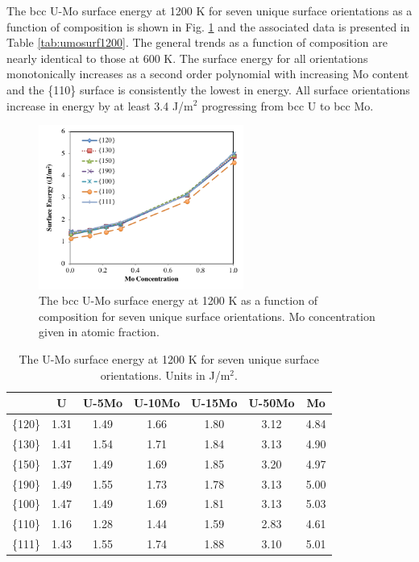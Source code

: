 \documentclass[review]{elsarticle}
\begin{document}
\FloatBarrier

The bcc U-Mo surface energy at 1200 K for seven unique surface orientations as a function of composition is shown in Fig. \ref{fig:umosurf1200} and the associated data is presented in Table \ref{tab:umosurf1200}. The general trends as a function of composition are nearly identical to those at 600 K. The surface energy for all orientations monotonically increases as a second order polynomial with increasing Mo content and the \{110\} surface is consistently the lowest in energy. All surface orientations increase in energy by at least 3.4 J/m$^{2}$ progressing from bcc U to bcc Mo. 

\begin{figure}[h]
 \centering
 \includegraphics[width=0.6\textwidth]{umosurf1200A.png} 
 \caption{The bcc U-Mo surface energy at 1200 K as a function of composition for seven unique surface orientations. Mo concentration given in atomic fraction.}
 \label{fig:umosurf1200}
\end{figure}

\begin{table}[h]
\caption{The U-Mo surface energy at 1200 K for seven unique surface orientations. Units in J/m$^{2}$.} \label{tab:umosurf1200}
\begin{center}
\begin{tabular}{|c|c|c|c|c|c|c|}
	\hline
 & U & U-5Mo & U-10Mo & U-15Mo & U-50Mo & Mo \\
\hline
\{120\} & 1.31 & 1.49 & 1.66 & 1.80 & 3.12 & 4.84 \\
\{130\}	 & 1.41 & 1.54 & 1.71 & 1.84 & 3.13 & 4.90 \\ 
\{150\}	 & 1.37 & 1.49 & 1.69 & 1.85 & 3.20 & 4.97 \\
\{190\}	 & 1.49 & 1.55 & 1.73 & 1.78 & 3.13 & 5.00 \\
\{100\}	 & 1.47 & 1.49 & 1.69 & 1.81 & 3.13 & 5.03 \\
\{110\}	 & 1.16 & 1.28 & 1.44 & 1.59 & 2.83 & 4.61 \\
\{111\}	 & 1.43 & 1.55 & 1.74 & 1.88 & 3.10 & 5.01 \\
 	 \hline
\end{tabular}
\end{center}
\label{default}
\end{table}
\end{document}

